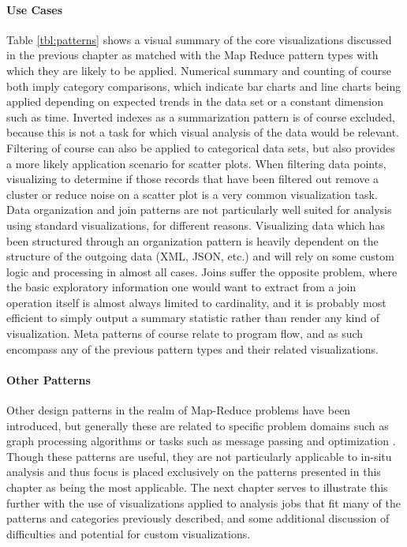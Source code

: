 \paragraph{Use Cases}
Table \ref{tbl:patterns} shows a visual summary of the core visualizations discussed in the previous chapter as matched with the Map Reduce pattern types with which they are likely to be applied. Numerical summary and counting of course both imply category comparisons, which indicate bar charts and line charts being applied depending on expected trends in the data set or a constant dimension such as time. Inverted indexes as a summarization pattern is of course excluded, because this is not a task for which visual analysis of the data would be relevant. Filtering of course can also be applied to categorical data sets, but also provides a more likely application scenario for scatter plots. When filtering data points, visualizing to determine if those records that have been filtered out remove a cluster or reduce noise on a scatter plot is a very common visualization task. Data organization and join patterns are not particularly well suited for analysis using standard visualizations, for different reasons. Visualizing data which has been structured through an organization pattern is heavily dependent on the structure of the outgoing data (XML, JSON, etc.) and will rely on some custom logic and processing in almost all cases. Joins suffer the opposite problem, where the basic exploratory information one would want to extract from a join operation itself is almost always limited to cardinality, and it is probably most efficient to simply output a summary statistic rather than render any kind of visualization. Meta patterns of course relate to program flow, and as such encompass any of the previous pattern types and their related visualizations. 

\paragraph{Other Patterns}
Other design patterns in the realm of Map-Reduce problems have been introduced, but generally these are related to specific problem domains such as graph processing algorithms or tasks such as message passing and optimization \cite{Lin2010}. Though these patterns are useful, they are not particularly applicable to in-situ analysis and thus focus is placed exclusively on the patterns presented in this chapter as being the most applicable. The next chapter serves to illustrate this further with the use of visualizations applied to analysis jobs that fit many of the patterns and categories previously described, and some additional discussion of difficulties and potential for custom visualizations. 

